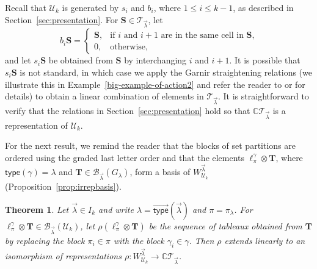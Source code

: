 \documentclass[10pt]{amsart}
\newtheorem{theorem}{Theorem}[section]
\theoremstyle{definition}
\theoremstyle{remark}
\newcommand{\CC}{\mathbb C}
\newcommand{\vtype}{\overrightarrow{\mathsf{type}}}
\begin{document}
Recall that $\mathcal{U}_k$ is generated by $s_i$ and $b_i$,
where $1\leqslant i \leqslant k-1$, as described in Section~\ref{sec:presentation}. For $\mathbf{S}\in \mathcal{T}_{\vec{\lambda}}$,
let
\begin{equation}
    \label{bi-action-on-S}
    b_i \mathbf{S} = \begin{cases} \mathbf{S}, & \text{if $i$ and $i+1$ are in the same cell in $\mathbf{S}$,}\\
    0, & \text{otherwise,}\end{cases}
\end{equation}
and let $s_i\mathbf{S}$ be obtained from $\mathbf{S}$ by interchanging $i$ and $i+1$. It is possible that
$s_i \mathbf{S}$ is not standard, in which case we apply the Garnir straightening relations
(we illustrate this in Example~\ref{big-example-of-action2} and refer the reader
to \cite[Section 2.6]{Sagan.2001} or \cite{CarreLascouxLeclerc} for details)
to obtain a linear combination of elements in $\mathcal{T}_{\vec{\lambda}}$.
It is straightforward to verify that the relations in Section~\ref{sec:presentation} hold
so that $\mathbb{C}\mathcal{T}_{\vec{\lambda}}$ is a representation of $\mathcal{U}_k$.

For the next result, we remind the reader that the blocks of set partitions are
ordered using the graded last letter order and that
the elements $\ell_\pi^\gamma \otimes \mathbf{T}$, where $\mathsf{type}(\gamma)
= \lambda$ and $\mathbf{T} \in \mathcal{B}_{\vec{\lambda}}(G_\lambda)$,
form a basis of $W^{\vec{\lambda}}_{\mathcal{U}_k}$ (Proposition~\ref{prop:irrepbasis}).
\begin{theorem}\label{th:tableauxmodule}
Let $\vec{\lambda}\in I_k$ and write $\lambda = \vtype(\vec{\lambda})$ and $\pi = \pi_\lambda$.
For $\ell_{\pi}^\gamma \otimes \mathbf{T} \in \mathcal{B}_{\vec{\lambda}}(\mathcal{U}_k)$, let
$\rho(\ell_{\pi}^\gamma \otimes \mathbf{T})$ be the sequence of tableaux obtained
from $\mathbf{T}$ by replacing the block $\pi_i\in \pi$ with the block $\gamma_i\in \gamma$.
Then $\rho$ extends linearly to an isomorphism of representations
$\rho \colon W^{\vec{\lambda}}_{\mathcal{U}_k}\rightarrow \CC\mathcal{T}_{\vec{\lambda}}$.
\end{theorem}
\end{document}

